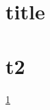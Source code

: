 \documentclass{book}
\begin{document}
   
	\section{title}
	\label{test}
	\section{t2}
	\ref{test}
	


%
\end{document}
